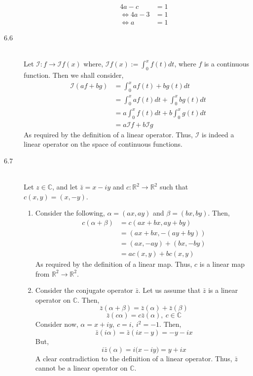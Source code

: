 \documentclass[letterpaper,10pt]{article}
\newcommand{\C}{\mathbb{C}}
\newcommand{\R}{\mathbb{R}}
\newcommand{\conj}{\bar{z}}
\begin{document}
\begin{description}
\begin{enumerate}[label=\alph*.]
\begin{align*}
4a-c&=1\\
\Leftrightarrow 4a-3&=1\\
\Leftrightarrow a&=1
\end{align*}
\end{enumerate}
\item[6.6]\hfill\\
Let $\mathcal{I}:f\to\mathcal{I}f(x)$ where, $\mathcal{I}f(x):=\int_{0}^{x}f(t)dt$, where $f$ is a continuous function. Then we shall consider,
\begin{align*}
\mathcal{I}(af+bg) &= \int_{0}^{x}af(t)+bg(t)dt\\
&=\int_{0}^{x}af(t)dt+\int_{0}^{x}bg(t)dt\\
&=a\int_{0}^{x}f(t)dt+b\int_{0}^{x}g(t)dt\\
&=a\mathcal{I}f+b\mathcal{I}g
\end{align*}
As required by the definition of a linear operator. Thus, $\mathcal{I}$ is indeed a linear operator on the space of continuous functions.
\item[6.7]\hfill\\
Let $z\in\C$, and let $\conj=x-iy$ and $c:\R^2\to\R^2$ such that $c(x,y)=(x,-y)$.
\begin{enumerate}[label=\alph*.]
\item Consider the following, $\alpha=(ax,ay)$ and $\beta=(bx,by)$. Then,
\begin{align*}
c(\alpha+\beta)&=c(ax+bx,ay+by)\\
&=(ax+bx,-(ay+by))\\
&=(ax,-ay)+(bx,-by)\\
&=ac(x,y)+bc(x,y)
\end{align*}
As required by the definition of a linear map. Thus, $c$ is a linear map from $\R^2\to\R^2$.
\item Consider the conjugate operator $\conj$. Let us assume that $\conj$ is a linear operator on $\C$. Then,
\[\conj(\alpha+\beta)=\conj(\alpha)+\conj(\beta)\]
\[\conj(c\alpha)=c\conj(\alpha),\ c\in\C\]
Consider now, $\alpha=x+iy,\ c=i,\ i^2=-1$. Then,
\[\conj(i\alpha)=\conj(ix-y)=-y-ix\]
But,
\[i\conj(\alpha)=i\big(x-iy\big)=y+ix\]
A clear contradiction to the definition of a linear operator. Thus, $\conj$ cannot be a linear operator on $\C$.
\end{enumerate}
\end{description}
\end{document}

